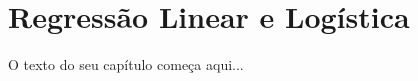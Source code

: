 
\chapter{Regressão Linear e Logística}
\label{cap:regressao}

O texto do seu capítulo começa aqui...